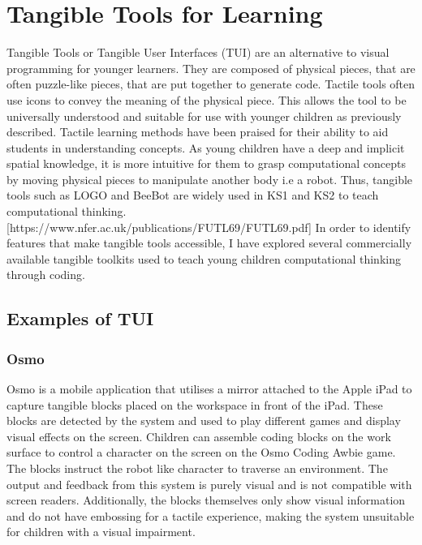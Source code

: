 \documentclass[oneside,%
                    author={Malak Hajji},
                    degree={BSc},
                    title={Designing An Accessible Computational Toolkit For Students},
                  subtitle={With Mixed Visual Abilities}]{dissertation}
\begin{document}
\section{Tangible Tools for Learning}

Tangible Tools or Tangible User Interfaces (TUI) are an alternative to visual programming for younger learners. They are composed of physical pieces, that are often puzzle-like pieces, that are put together to generate code. Tactile tools often use icons to convey the meaning of the physical piece. This allows the tool to be universally understood and suitable for use with younger children as previously described. Tactile learning methods have been praised for their ability to aid students in understanding concepts. As young children have a deep and implicit spatial knowledge, it is more intuitive for them to grasp computational concepts by moving physical pieces to manipulate another body i.e a robot. Thus, tangible tools such as LOGO and BeeBot are widely used in KS1 and KS2 to teach computational thinking. [https://www.nfer.ac.uk/publications/FUTL69/FUTL69.pdf]
In order to identify features that make tangible tools accessible, I have explored several commercially available tangible toolkits used to teach young children computational thinking through coding.

\subsection{Examples of TUI}
\subsubsection{Osmo}
Osmo is a mobile application that utilises a mirror attached to the Apple iPad to capture tangible blocks placed on the workspace in front of the iPad. These blocks are detected by the system and used to play different games and display visual effects on the screen. Children can assemble coding blocks on the work surface to control a character on the screen on the Osmo Coding Awbie game. The blocks instruct the robot like character to traverse an environment. The output and feedback from this system is purely visual and is not compatible with screen readers. Additionally, the blocks themselves only show visual information and do not have embossing for a tactile experience, making the system unsuitable for children with a visual impairment.  
\end{document}
